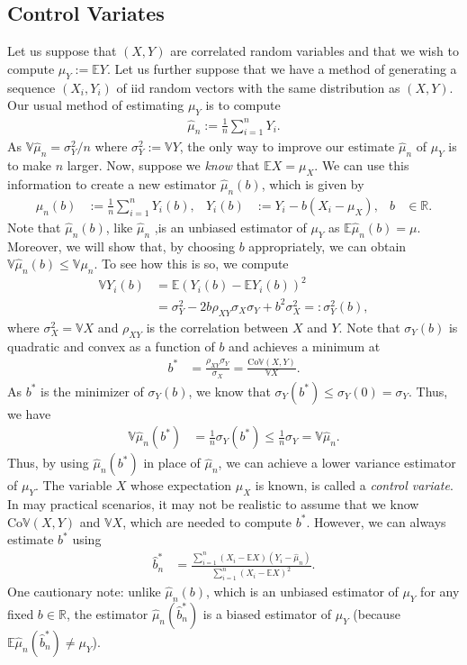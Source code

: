 \documentclass[12pt]{book}
\numberwithin{equation}{chapter}
\theoremstyle{plain}
\numberwithin{theorem}{section}
\theoremstyle{definition}
\numberwithin{exercise}{chapter}
\newcommand{\<}{\langle}
\renewcommand{\>}{\rangle}
\renewcommand{\(}{\left(}
\renewcommand{\)}{\right)}
\renewcommand{\[}{\left[}
\renewcommand{\]}{\right]}
\newcommand\Eb{\mathds{E}}
\newcommand\Rb{\mathds{R}}
\newcommand\Vb{\mathds{V}}
\newcommand\sig{\sigma}
\newcommand\muh{\widehat{\mu}}
\begin{document}
\subsection{Control Variates}
Let us suppose that $(X,Y)$ are correlated random variables and that we wish to compute $\mu_Y := \Eb Y$.  Let us further suppose that we have a method of generating a sequence $(X_i,Y_i)$ of iid random vectors with the same distribution as $(X,Y)$.  Our usual method of estimating $\mu_Y$ is to compute
\begin{align}
\muh_n
	:=	\frac{1}{n} \sum_{i=1}^n Y_i .
\end{align} 
As $\Vb \muh_n = \sig_Y^2/n$ where $\sig_Y^2 := \Vb Y $, the only way to improve our estimate $\muh_n$ of $\mu_Y$ is to make $n$ larger.  Now, suppose we \emph{know} that $\Eb X = \mu_X$.  We can use this information to create a new estimator $\muh_n(b)$, which is given by
\begin{align}
\muh_n(b)
	&:=	\frac{1}{n} \sum_{i=1}^n Y_i(b) , &
Y_i(b)
	&:=	 Y_i - b ( X_i - \mu_X )  , &
b
	&\in \Rb .
\end{align}
Note that $\muh_n(b)$, like $\muh_n$ ,is an unbiased estimator of $\mu_Y$ as $\Eb \muh_n(b) = \mu$.  Moreover, we will show that, by choosing $b$ appropriately, we can obtain $\Vb \muh_n(b) \leq \Vb \mu_n$.  To see how this is so, we compute
\begin{align}
\Vb Y_i(b)
	&=	\Eb (Y_i(b) - \Eb Y_i(b) )^2 \\
	&=		\sig_Y^2 - 2 b \rho_{XY} \sig_X \sig_Y + b^2 \sig_X^2 =: \sig_Y^2(b),
\end{align}
where $\sig_X^2 = \Vb X$ and $\rho_{XY}$ is the correlation between $X$ and $Y$.  Note that $\sig_Y(b)$ is quadratic and convex as a function of $b$ and achieves a minimum at
\begin{align}
b^* 
	&= \frac{\rho_{XY} \sig_Y }{ \sig_X } 
	=		\frac{ \text{Co}\Vb(X,Y) }{ \Vb X} .
\end{align}
As $b^*$ is the minimizer of $\sig_Y(b)$, we know that $\sig_Y(b^*) \leq \sig_Y(0) = \sig_Y$.  Thus, we have
\begin{align}
\Vb \muh_n(b^*)
	&=	\frac{1}{n} \sig_Y(b^*)
	\leq	\frac{1}{n} \sig_Y
	=		\Vb \muh_n .
\end{align}
Thus, by using $\muh_n(b^*)$ in place of $\muh_n$, we can achieve a lower variance estimator of $\mu_Y$. 
The variable $X$ whose expectation $\mu_X$ is known, is called a \emph{control variate}. 
\\[0.5em]
In may practical scenarios, it may not be realistic to assume that we know $\text{Co}\Vb(X,Y)$ and $\Vb X$, which are needed to compute $b^*$.  However, we can always estimate $b^*$ using
\begin{align}
\widehat{b}_n^*
	&=	\frac{ \sum_{i=1}^n (X_i - \Eb X)( Y_i - \muh_n) }{\sum_{i=1}^n (X_i-\Eb X)^2} .
\end{align}
One cautionary note: unlike $\muh_n(b)$, which is an unbiased estimator of $\mu_Y$ for any fixed $b \in \Rb$, the estimator $\muh_n(\widehat{b}_n^*)$ is a biased estimator of $\mu_Y$ (because $\Eb \muh_n(\widehat{b}_n^*) \neq \mu_Y$).
\end{document}
